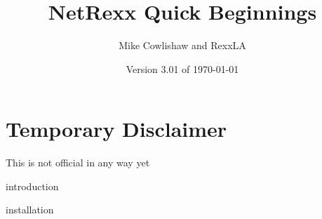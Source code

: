 \documentclass[10pt]{book}
\begin{document}
        
\setcounter{tocdepth}{1} 
\title{NetRexx Quick Beginnings}
\author{Mike Cowlishaw and RexxLA}
\date{Version 3.01 of \today}
\maketitle
{}
\pagestyle{plain}
\frontmatter
{}
\pagestyle{plain}
\section*{Temporary Disclaimer}
This is not official in any way yet
\newpage
\tableofcontents
\newpage
{}
\frontmatter
\large


 {introduction}
\mainmatter

 {installation}








\backmatter
\listoffigures
\listoftables
\printindex
\end{document}
